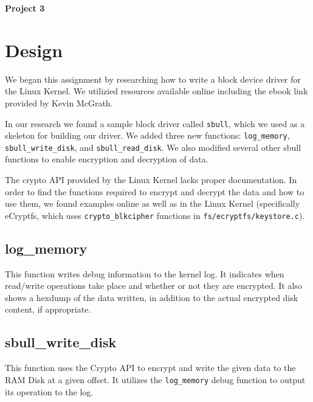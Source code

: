 \documentclass[11pt,letterpaper]{article}
\begin{document}



\begin{center} \large \textbf{Project 3} \end{center}

\section*{Design}

\par We began this assignment by researching how to write a block device driver for the Linux Kernel. We utilizied resources available online including the ebook link provided by Kevin McGrath. 

\par In our research we found a sample block driver called \verb|sbull|, which we used as a skeleton for building our driver. We added three new functions: \verb|log_memory|, \verb|sbull_write_disk|, and \verb|sbull_read_disk|. We also modified several other sbull functions to enable encryption and decryption of data.

\par The crypto API provided by the Linux Kernel lacks proper documentation. In order to find the functions required to encrypt and decrypt the data and how to use them, we found examples online as well as in the Linux Kernel (specifically eCryptfs, which uses \verb|crypto_blkcipher| functions in \verb|fs/ecryptfs/keystore.c|).

\subsection*{log\_memory}
This function writes debug information to the kernel log. It indicates when read/write operations take place and whether or not they are encrypted. It also shows a hexdump of the data written, in addition to the actual encrypted disk content, if appropriate.

\subsection*{sbull\_write\_disk}
This function uses the Crypto API to encrypt and write the given data to the RAM Disk at a given offset. It utilizes the \verb|log_memory| debug function to output its operation to the log. 
\end{document}
